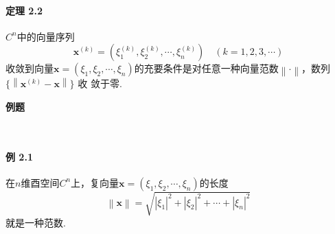 \documentclass[12pt, a4paper, oneside, fontset=none]{ctexart}
\begin{document}
\paragraph*{定理 2.2} $C^n$中的向量序列
\[
    \bm{x}^{(k)} = (\xi_1^{(k)},\xi_2^{(k)},\cdots,\xi_n^{(k)}) \quad (k=1,2,3,\cdots)
\]
收敛到向量$\bm{x} = (\xi_1,\xi_2,\cdots,\xi_n)$的充要条件是对任意一种向量范数$\left\lVert \bm{\cdot} \right\rVert$，数列$\{\left\lVert \bm{x}^{(k)} - \bm{x} \right\rVert\}$ 收
敛于零.

\centerline{\large{\textbf{例题}}} \ \par

\paragraph*{例 2.1} 在$n$维酉空间$C^n$上，复向量$\bm{x} = (\xi_1,\xi_2,\cdots,\xi_n)$的长度
\[
    \left\lVert \bm{x} \right\rVert = \sqrt{\left\lvert \xi_1 \right\rvert^2 + \left\lvert \xi_2 \right\rvert^2 + \cdots +\left\lvert \xi_n \right\rvert^2}
\]
就是一种范数. \par
\end{document}
